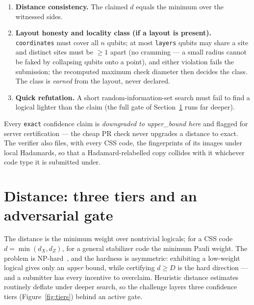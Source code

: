\documentclass[11pt]{article}
\newcommand{\HZ}{H_Z}
\begin{document}
\begin{enumerate}[label=(V\arabic*),leftmargin=*,nosep]
		$\HZ$; a Pauli witness commutes with every generator), and (c) be
		nontrivial, i.e.\ not in the rowspace of its own checks (not a
		stabilizer product). This certifies
		$d_{\text{side}}\le\texttt{value}$ as an \emph{upper bound} with no
		trust required.
		\item \textbf{Distance consistency.} The claimed $d$ equals the
		minimum over the witnessed sides.
		\item \textbf{Layout honesty and locality class (if a layout is
		present).} \texttt{coordinates} must cover all $n$ qubits; at most
		\texttt{layers} qubits may share a site and distinct sites must be
		$\ge 1$ apart (no cramming --- a small radius cannot be faked by
		collapsing qubits onto a point), and either violation fails the
		submission; the recomputed maximum check diameter then decides the
		class. The class is \emph{earned} from the layout, never declared.
		\item \textbf{Quick refutation.} A short random-information-set
		search must fail to find a logical lighter than the claim (the full
		gate of Section~\ref{sec:distance} runs far deeper).
	\end{enumerate}
	Every \texttt{exact} confidence claim is \emph{downgraded to
	upper\_bound here} and flagged for server certification --- the cheap PR
	check never upgrades a distance to exact. The verifier also files, with
	every CSS code, the fingerprints of its images under local Hadamards, so
	that a Hadamard-relabelled copy collides with it whichever code type it
	is submitted under.

	\section{Distance: three tiers and an adversarial gate}
	\label{sec:distance}

	The distance is the minimum weight over nontrivial logicals; for a CSS
	code $d=\min(d_X,d_Z)$, for a general stabilizer code the minimum Pauli
	weight. The problem is NP-hard~\cite{kapshikar2023hardness}, and the
	hardness is asymmetric: exhibiting a low-weight logical gives only an
	\emph{upper} bound, while certifying $d\ge D$ is the hard direction ---
	and a submitter has every incentive to overclaim. Heuristic distance
	estimates routinely deflate under deeper search, so the challenge layers
	three confidence tiers (Figure~\ref{fig:tiers}) behind an active gate.
\end{document}

